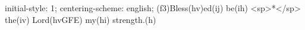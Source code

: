 initial-style: 1;
centering-scheme: english;
(f3)Bless(hv)ed(ij) be(ih) <sp>*</sp> the(iv) Lord(hvGFE) my(hi) strength.(h)
